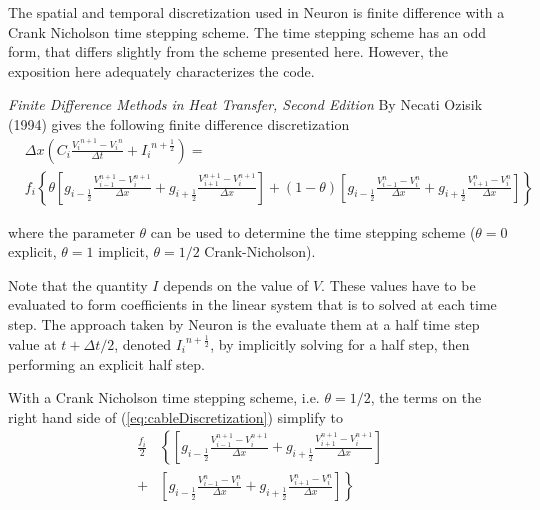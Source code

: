 \documentclass[11pt,a4paper]{article}
\newcommand{\eq}[1]{(\ref{#1})} %
\newcommand{\dx}{{\Delta x}} %
\newcommand{\dt}{{\Delta t}} %
\newcommand{\at}[1]{{#1}_{i}} %
\newcommand{\atplus}[1]{{#1}_{i+1}} %
\newcommand{\atminus}[1]{{#1}_{i-1}} %
\newcommand{\atplushalf}[1]{{#1}_{i+\frac{1}{2}}} %
\newcommand{\atminushalf}[1]{{#1}_{i-\frac{1}{2}}} %
\newcommand{\att}[1]{{#1}^{n}} %
\newcommand{\attplus}[1]{{#1}^{n+1}} %
\newcommand{\attplushalf}[1]{{#1}^{n+\frac{1}{2}}} %
\begin{document}
The spatial and temporal discretization used in Neuron is finite difference with a Crank Nicholson time stepping scheme. The time stepping scheme has an odd form, that differs slightly from the scheme presented here. However, the exposition here adequately characterizes the code.

\emph{Finite Difference Methods in Heat Transfer, Second Edition} By Necati Ozisik (1994) gives the following finite difference discretization
\begin{align}
    &\dx \left(\at{C} \frac{\attplus{\at{V}} - \att{\at{V}}}{\dt} + \attplushalf{\at{I}} \right)
    =\nonumber \\
    &\at{f}
        \left\{
            \theta
            \left[
                \atminushalf{g} \frac{\atminus{V}^{n+1}-\at{V}^{n+1}}{\dx}
              + \atplushalf{g}  \frac{\atplus{V}^{n+1}-\at{V}^{n+1}}{\dx}
            \right]
    +
            (1-\theta)
            \left[
                \atminushalf{g} \frac{\atminus{V}^{n}-\at{V}^{n}}{\dx}
              + \atplushalf{g}  \frac{\atplus{V}^{n}-\at{V}^{n}}{\dx}
            \right]
        \right\} \label{eq:cableDiscretization}
\end{align}

where the parameter $\theta$ can be used to determine the time stepping scheme ($\theta=0$ explicit, $\theta=1$ implicit, $\theta=1/2$ Crank-Nicholson).

Note that the quantity $I$ depends on the value of $V$. These values have to be evaluated to form coefficients in the linear system that is to solved at each time step. The approach taken by Neuron is the evaluate them at a half time step value at $t+\dt/2$, denoted $\attplushalf{\at{I}}$, by implicitly solving for a half step, then performing an explicit half step.

With a Crank Nicholson time stepping scheme, i.e. $\theta=1/2$, the terms on the right hand side of \eq{eq:cableDiscretization} simplify to
\begin{align}
        \frac{\at{f}}{2}
        &\left\{
            \left[
                \atminushalf{g} \frac{\atminus{V}^{n+1}-\at{V}^{n+1}}{\dx}
              + \atplushalf{g}  \frac{\atplus{V}^{n+1}-\at{V}^{n+1}}{\dx}
            \right]
        \right. \nonumber \\
        +
        &\left.
            \left[
                \atminushalf{g} \frac{\atminus{V}^{n}-\at{V}^{n}}{\dx}
              + \atplushalf{g}  \frac{\atplus{V}^{n}-\at{V}^{n}}{\dx}
            \right]
        \right\} \label{eq:crankNichRHS}
\end{align}
\end{document}
